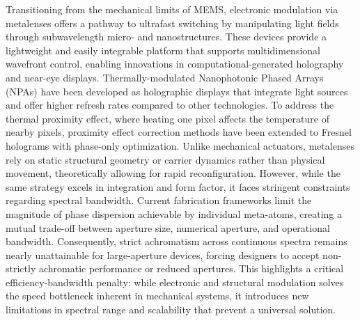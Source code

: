 \documentclass[11pt]{article}
\begin{document}
Transitioning from the mechanical limits of MEMS, electronic modulation via metalenses offers a pathway to ultrafast switching by manipulating light fields through subwavelength micro- and nanostructures. These devices provide a lightweight and easily integrable platform that supports multidimensional wavefront control, enabling innovations in computational-generated holography and near-eye displays. Thermally-modulated Nanophotonic Phased Arrays (NPAs) have been developed as holographic displays that integrate light sources and offer higher refresh rates compared to other technologies. To address the thermal proximity effect, where heating one pixel affects the temperature of nearby pixels, proximity effect correction methods have been extended to Fresnel holograms with phase-only optimization. \citep{doi_10_1109_vr50410_2021_00058_601721f7} Unlike mechanical actuators, metalenses rely on static structural geometry or carrier dynamics rather than physical movement, theoretically allowing for rapid reconfiguration. However, while the same strategy excels in integration and form factor, it faces stringent constraints regarding spectral bandwidth. Current fabrication frameworks limit the magnitude of phase dispersion achievable by individual meta-atoms, creating a mutual trade-off between aperture size, numerical aperture, and operational bandwidth. Consequently, strict achromatism across continuous spectra remains nearly unattainable for large-aperture devices, forcing designers to accept non-strictly achromatic performance or reduced apertures. This highlights a critical efficiency-bandwidth penalty: while electronic and structural modulation solves the speed bottleneck inherent in mechanical systems, it introduces new limitations in spectral range and scalability that prevent a universal solution. \citep{doi_10_1038_s41377_026_02272_y_42e58df2}
\end{document}
